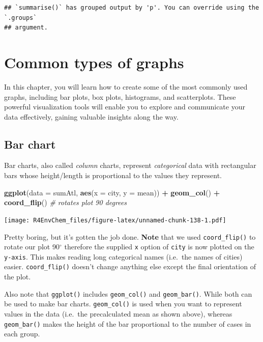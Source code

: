 \documentclass[
]{book}
\newenvironment{Shaded}{\begin{snugshade}}{\end{snugshade}}
\newcommand{\AttributeTok}[1]{\textcolor[rgb]{0.13,0.29,0.53}{#1}}
\newcommand{\CommentTok}[1]{\textcolor[rgb]{0.56,0.35,0.01}{\textit{#1}}}
\newcommand{\FunctionTok}[1]{\textcolor[rgb]{0.13,0.29,0.53}{\textbf{#1}}}
\newcommand{\NormalTok}[1]{#1}
\newcommand{\SpecialCharTok}[1]{\textcolor[rgb]{0.81,0.36,0.00}{\textbf{#1}}}
\begin{document}
\begin{verbatim}
## `summarise()` has grouped output by 'p'. You can override using the `.groups`
## argument.
\end{verbatim}

\hypertarget{common-types-of-graphs}{%
\chapter{Common types of graphs}\label{common-types-of-graphs}}

In this chapter, you will learn how to create some of the most commonly used graphs, including bar plots, box plots, histograms, and scatterplots. These powerful visualization tools will enable you to explore and communicate your data effectively, gaining valuable insights along the way.

\hypertarget{bar-chart}{%
\section{Bar chart}\label{bar-chart}}

Bar charts, also called \emph{column} charts, represent \emph{categorical} data with rectangular bars whose height/length is proportional to the values they represent.

\begin{Shaded}
\begin{Highlighting}[]
\FunctionTok{ggplot}\NormalTok{(}\AttributeTok{data =}\NormalTok{ sumAtl,}
       \FunctionTok{aes}\NormalTok{(}\AttributeTok{x =}\NormalTok{ city, }
           \AttributeTok{y =}\NormalTok{ mean)) }\SpecialCharTok{+}
  \FunctionTok{geom\_col}\NormalTok{() }\SpecialCharTok{+}
  \FunctionTok{coord\_flip}\NormalTok{() }\CommentTok{\# rotates plot 90 degrees}
\end{Highlighting}
\end{Shaded}

\texttt{[image: R4EnvChem\_files/figure-latex/unnamed-chunk-138-1.pdf]}

Pretty boring, but it's gotten the job done. \textbf{Note} that we used \texttt{coord\_flip()} to rotate our plot 90\(^\circ\) therefore the supplied \texttt{x} option of \texttt{city} is now plotted on the \texttt{y-axis}. This makes reading long categorical names (i.e.~the names of cities) easier. \texttt{coord\_flip()} doesn't change anything else except the final orientation of the plot.

Also note that \texttt{ggplot()} includes \texttt{geom\_col()} and \texttt{geom\_bar()}. While both can be used to make bar charts. \texttt{geom\_col()} is used when you want to represent values in the data (i.e.~the precalculated mean as shown above), whereas \texttt{geom\_bar()} makes the height of the bar proportional to the number of cases in each group.
\end{document}
